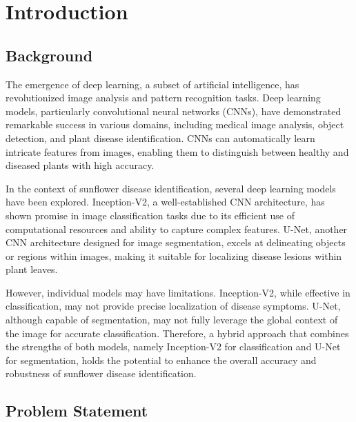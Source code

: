 
\section{Introduction}

\subsection{Background}

The emergence of deep learning, a subset of artificial intelligence, has revolutionized image analysis and pattern recognition tasks. Deep learning models, particularly convolutional neural networks (CNNs), have demonstrated remarkable success in various domains, including medical image analysis, object detection, and plant disease identification. CNNs can automatically learn intricate features from images, enabling them to distinguish between healthy and diseased plants with high accuracy.

In the context of sunflower disease identification, several deep learning models have been explored. Inception-V2, a well-established CNN architecture, has shown promise in image classification tasks due to its efficient use of computational resources and ability to capture complex features. U-Net, another CNN architecture designed for image segmentation, excels at delineating objects or regions within images, making it suitable for localizing disease lesions within plant leaves.

However, individual models may have limitations. Inception-V2, while effective in classification, may not provide precise localization of disease symptoms. U-Net, although capable of segmentation, may not fully leverage the global context of the image for accurate classification. Therefore, a hybrid approach that combines the strengths of both models, namely Inception-V2 for classification and U-Net for segmentation, holds the potential to enhance the overall accuracy and robustness of sunflower disease identification.
\clearpage
\subsection{Problem Statement}


